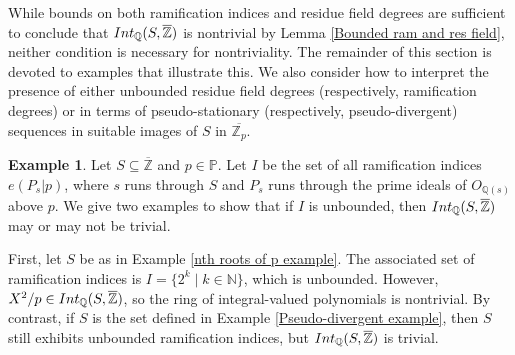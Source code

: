 \documentclass{article}
\theoremstyle{definition}\newtheorem{Def}[equation]{Definition}
\newtheorem{Ex}[equation]{Example}
\theoremstyle{definition}\newtheorem{Ques}[equation]{Question}
\theoremstyle{definition}\newtheorem{Conj}[equation]{Conjecture}
\theoremstyle{definition}\newtheorem{Not}[equation]{Notation}
\newcommand{\N}{\mathbb{N}}
\newcommand{\Q}{\mathbb{Q}}
\newcommand{\oQ}{\overline{\Q}}
\newcommand{\oZ}{\overline{\Z}}
\newcommand{\Z}{\mathbb{Z}}
\newcommand{\oZp}{\overline{\Z_p}}
\newcommand{\Int}{\textnormal{Int}}
\newcommand{\IntQ}{\Int_{\Q}}
\newcommand{\PP}{\mathbb{P}}
\numberwithin{equation}{section}
\begin{document}
While bounds on both ramification indices and residue field degrees are sufficient to conclude that $\IntQ(S,\oZ)$ is nontrivial by Lemma \ref{Bounded ram and res field}, neither condition is necessary for nontriviality. The remainder of this section is devoted to examples that illustrate this. We also consider how to interpret the presence of either unbounded residue field degrees (respectively, ramification degrees) or in terms of pseudo-stationary (respectively, pseudo-divergent) sequences in suitable images of $S$ in $\oZp$.

\begin{Ex}\label{Unbounded ram lemma}
Let $S \subseteq \oZ$ and $p \in \PP$. Let $I$ be the set of all ramification indices $e(P_s|p)$, where $s$ runs through $S$ and $P_s$ runs through the prime ideals of $O_{\Q(s)}$ above $p$. We give two examples to show that if $I$ is unbounded, then $\IntQ(S,\oZ)$ may or may not be trivial.

First, let $S$ be as in Example \ref{nth roots of p example}. The associated set of ramification indices is $I = \{2^k \mid k \in \N\}$, which is unbounded. However, $X^2/p \in \IntQ(S,\oZ)$, so the ring of integral-valued polynomials is nontrivial. By contrast, if $S$ is the set defined in Example \ref{Pseudo-divergent example}, then $S$ still exhibits unbounded ramification indices, but $\IntQ(S,\oZ)$ is trivial.
\end{Ex}



\end{document}
